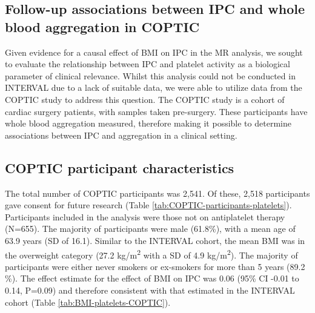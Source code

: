 \documentclass[11pt,twoside]{bristolthesis}
\begin{document}
\hypertarget{follow-up-associations-between-ipc-and-whole-blood-aggregation-in-coptic}{%
\subsection{Follow-up associations between IPC and whole blood aggregation in COPTIC}\label{follow-up-associations-between-ipc-and-whole-blood-aggregation-in-coptic}}

Given evidence for a causal effect of BMI on IPC in the MR analysis, we sought to evaluate the relationship between IPC and platelet activity as a biological parameter of clinical relevance. Whilst this analysis could not be conducted in INTERVAL due to a lack of suitable data, we were able to utilize data from the COPTIC study to address this question. The COPTIC study is a cohort of cardiac surgery patients, with samples taken pre-surgery. These participants have whole blood aggregation measured, therefore making it possible to determine associations between IPC and aggregation in a clinical setting.

\hypertarget{coptic-participant-characteristics}{%
\subsection{COPTIC participant characteristics}\label{coptic-participant-characteristics}}

The total number of COPTIC participants was 2,541. Of these, 2,518 participants gave consent for future research (Table \ref{tab:COPTIC-participants-platelets}). Participants included in the analysis were those not on antiplatelet therapy (N=655). The majority of participants were male (61.8\%), with a mean age of 63.9 years (SD of 16.1). Similar to the INTERVAL cohort, the mean BMI was in the overweight category (27.2 kg/m\textsuperscript{2} with a SD of 4.9 kg/m\textsuperscript{2}). The majority of participants were either never smokers or ex-smokers for more than 5 years (89.2 \%). The effect estimate for the effect of BMI on IPC was 0.06 (95\% CI -0.01 to 0.14, P=0.09) and therefore consistent with that estimated in the INTERVAL cohort (Table \ref{tab:BMI-platelets-COPTIC}).
\end{document}
